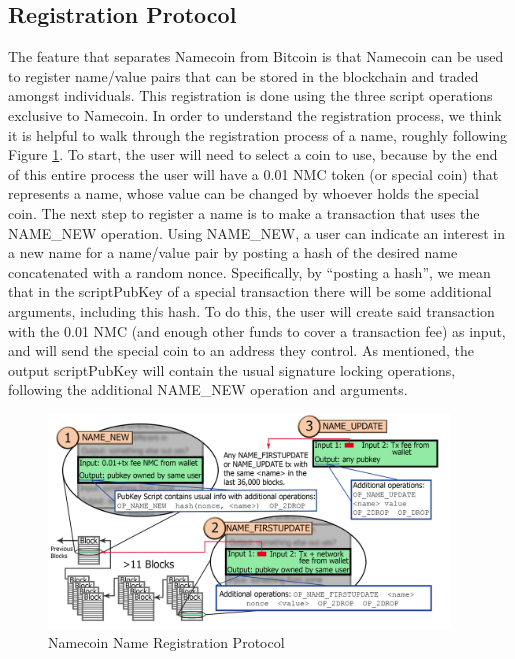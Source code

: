 \subsection{Registration Protocol}
The feature that separates Namecoin from Bitcoin is that Namecoin can be used to register name/value pairs that can be stored in the blockchain and traded amongst individuals. This registration is done using the three script operations exclusive to Namecoin. In order to understand the registration process, we think it is helpful to walk through the registration process of a name, roughly following Figure \ref{fig:registration}. To start, the user will need to select a coin to use, because by the end of this entire process the user will have a 0.01 NMC token (or special coin) that represents a name, whose value can be changed by whoever holds the special coin. The next step to register a name is to make a transaction that uses the NAME\_NEW  operation. Using NAME\_NEW, a user can indicate an interest in a new name for a name/value pair by posting a hash of the desired name concatenated with a random nonce. Specifically, by ``posting a hash'', we mean that in the scriptPubKey of a special transaction there will be some additional arguments, including this hash. To do this, the user will create said transaction with the 0.01 NMC (and enough other funds to cover a transaction fee) as input, and will send the special coin to an address they control. As mentioned, the output scriptPubKey will contain the usual signature locking operations, following the additional NAME\_NEW operation and arguments.

\begin{figure}
  \centering
  \includegraphics[width=0.95\textwidth]{registration.png}
  \caption{Namecoin Name Registration Protocol}
  \label{fig:registration}
\end{figure}

